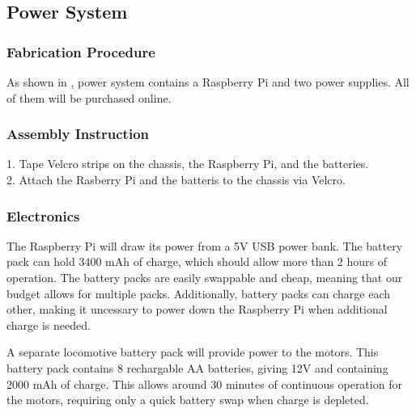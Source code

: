 
\subsection{Power System}
\label{sec:hardware_power}

\subsubsection{Fabrication Procedure}
\label{sec:power_fab}
As shown in , power system contains a Raspberry Pi and two power supplies. All of them will be purchased online.

\subsubsection{Assembly Instruction}
\label{sec:power_assemb}
1. Tape Velcro strips on the chassis, the Raspberry Pi, and the batteries.\\
2. Attach the Rasberry Pi and the batteris to the chassis via Velcro. 

\subsubsection{Electronics}
\label{sec:power_electronics}
The Raspberry Pi will draw its power from a 5V USB power bank. The battery pack can hold 3400 mAh of charge, which should allow more than 2 hours of operation. The battery packs are easily swappable and cheap, meaning that our budget allows for multiple packs. Additionally, battery packs can charge each other, making it uncessary to power down the Raspberry Pi when additional charge is needed.

A separate locomotive battery pack will provide power to the motors. This battery pack contains 8 rechargable AA batteries, giving 12V and containing 2000 mAh of charge. This allows around 30 minutes of continuous operation for the motors, requiring only a quick battery swap when charge is depleted.